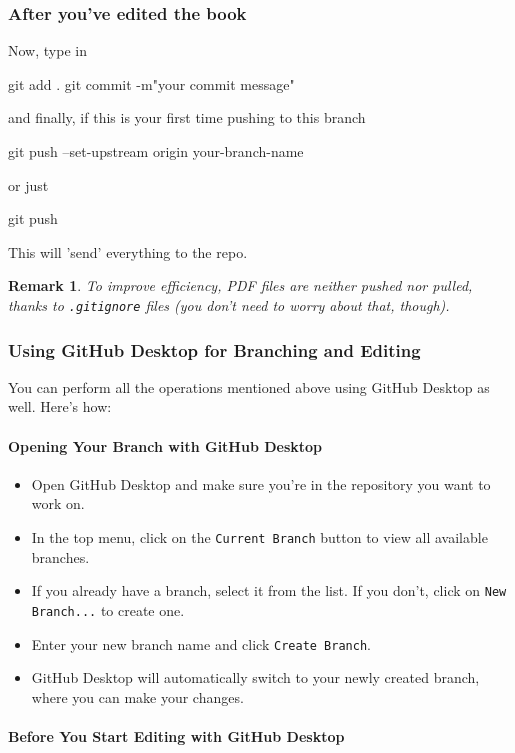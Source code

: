 \documentclass{article}
\newtheorem{remark}{Remark}
\begin{document}
\subsubsection{After you've edited the book}
Now, type in
\begin{bashcode}
    git add .
    git commit -m"your commit message"
\end{bashcode}
and finally, if this is your first time pushing to this branch
\begin{bashcode}
    git push --set-upstream origin your-branch-name
\end{bashcode}
or just 
\begin{bashcode}
    git push
\end{bashcode}
This will 'send' everything to the repo.
\begin{remark}
    To improve efficiency, PDF files are neither pushed nor pulled, thanks to \texttt{.gitignore} files (you don't need to worry about that, though).
\end{remark}

\subsubsection{Using GitHub Desktop for Branching and Editing}

You can perform all the operations mentioned above using GitHub Desktop as well. Here's how:

\paragraph{Opening Your Branch with GitHub Desktop}

\begin{itemize}
    \item Open GitHub Desktop and make sure you're in the repository you want to work on.
    \item In the top menu, click on the \texttt{Current Branch} button to view all available branches.
    \item If you already have a branch, select it from the list. If you don't, click on \texttt{New Branch...} to create one.
    \item Enter your new branch name and click \texttt{Create Branch}.
    \item GitHub Desktop will automatically switch to your newly created branch, where you can make your changes.
\end{itemize}

\paragraph{Before You Start Editing with GitHub Desktop}
\end{document}
